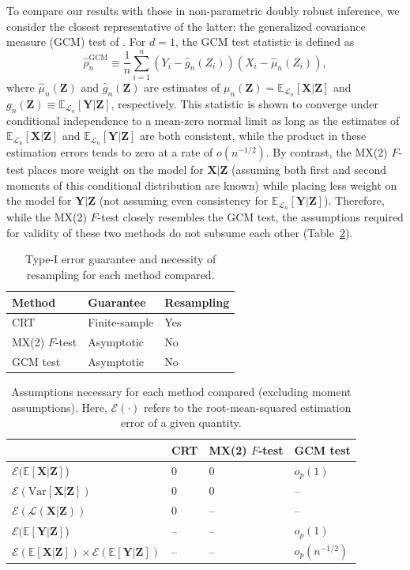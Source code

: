 \documentclass[ejs]{imsart}
\numberwithin{equation}{section}
\theoremstyle{plain}
\theoremstyle{definition}
\theoremstyle{remark}
\newcommand{\prx}{\bm X}
\newcommand{\srx}{X}
\newcommand{\prz}{\bm Z}
\newcommand{\srz}{Z}
\newcommand{\pry}{{\bm Y}}
\newcommand{\sry}{Y}
\begin{document}
To compare our results with those in non-parametric doubly robust inference, we consider the closest representative of the latter: the generalized covariance measure (GCM) test of \citet{Shah2018}. For $d = 1$, the GCM test statistic is defined as
\begin{equation}
	\widehat \rho^{\text{GCM}}_n \equiv \frac{1}{n}\sum_{i = 1}^n  (\sry_i - \widehat g_n(\srz_i))(\srx_i - \widehat \mu_n(\srz_i)),
\end{equation}
where $\widehat \mu_n(\prz)$ and $\widehat g_n(\prz)$ are estimates of $\mu_n(\prz) = \mathbb E_{\mathcal L_n}[\prx|\prz]$ and $g_n(\prz) \equiv \mathbb E_{\mathcal L_n}[\pry|\prz]$, respectively. This statistic is shown to converge under conditional independence to a mean-zero normal limit as long as the estimates of $\mathbb E_{\mathcal L_n}[\prx|\prz]$ and $\mathbb E_{\mathcal L_n}[\pry|\prz]$ are both consistent, while the product in these estimation errors tends to zero at a rate of $o(n^{-1/2})$. By contrast, the MX(2) $F$-test places more weight on the model for $\prx|\prz$ (assuming both first and second moments of this conditional distribution are known) while placing less weight on the model for $\pry|\prz$ (not assuming even consistency for $\mathbb E_{\mathcal L_n}[\pry|\prz]$). Therefore, while the MX(2) $F$-test closely resembles the GCM test, the assumptions required for validity of these two methods do not subsume each other (Table~\ref{tab:summary-2}). 

	\begin{table}[h!]
	\centering
	\begin{tabular}{l|ll}
		Method & Guarantee & Resampling \\
		\hline
		CRT & Finite-sample & Yes \\	
		MX(2) $F$-test & Asymptotic & No  \\
		GCM test & Asymptotic & No
	\end{tabular}
	\caption{Type-I error guarantee and necessity of resampling for each method compared.}
	\label{tab:summary-1}
\end{table}

\begin{table}[h!]
	\small
	\begin{tabular}{l|lll}
		 & CRT & MX(2) $F$-test & GCM test \\
		\hline
		$\mathcal E(\mathbb E[\prx|\prz]$) & 0 & 0 & $o_p(1)$  \\
		$\mathcal E(\text{Var}[\prx|\prz])$  & 0  & 0 & -- \\
		$\mathcal E(\mathcal L(\prx|\prz))$ & 0 & -- & -- \\
		$\mathcal E(\mathbb E[\pry|\prz]$) & -- & -- & $o_p(1)$ \\
		$\mathcal E(\mathbb E[\prx|\prz]) \times \mathcal E(\mathbb E[\pry|\prz])$ & -- & -- & $o_p(n^{-1/2})$
	\end{tabular}
	\caption{Assumptions necessary for each method compared (excluding moment assumptions). Here, $\mathcal E(\cdot)$ refers to the root-mean-squared estimation error of a given quantity.}
	\label{tab:summary-2}
\end{table}
\end{document}
